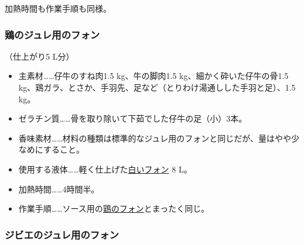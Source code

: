 \begin{recette}
加熱時間も作業手順も同様。

\atoaki{}

\hypertarget{fonds-pour-gelee-de-volaille}{%
\subsubsection{鶏のジュレ用のフォン}\label{fonds-pour-gelee-de-volaille}}



（仕上がり5 L分）

\begin{itemize}
\item
  主素材\ldots{}\ldots{}仔牛のすね肉1.5 kg、牛の脚肉1.5
  kg、細かく砕いた仔牛の骨1.5
  kg、鶏ガラ、とさか、手羽先、足など（とりわけ湯通しした手羽と足）、1.5
  kg。
\item
  ゼラチン質\ldots{}\ldots{}骨を取り除いて下茹でした仔牛の足（小）3本。
\item
  香味素材\ldots{}\ldots{}材料の種類は標準的なジュレ用のフォンと同じだが、量はやや少なめにすること。
\item
  使用する液体\ldots{}\ldots{}軽く仕上げた\protect\hyperlink{fonds-blanc}{白いフォン}
  8 L。
\item
  加熱時間\ldots{}\ldots{}4時間半。
\item
  作業手順\ldots{}\ldots{}ソース用の\protect\hyperlink{fonds-de-volaille}{鶏のフォン}とまったく同じ。
\end{itemize}

\atoaki{}

\hypertarget{fonds-pour-gelee-de-gibier}{%
\subsubsection{ジビエのジュレ用のフォン}\label{fonds-pour-gelee-de-gibier}}




\end{recette}
